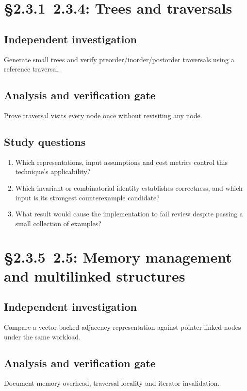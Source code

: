 \documentclass[11pt,letterpaper]{article}
\begin{document}
\section{\S 2.3.1--2.3.4: Trees and traversals}
\subsection{Independent investigation}
Generate small trees and verify preorder/inorder/postorder traversals using a reference traversal.
\subsection{Analysis and verification gate}
Prove traversal visits every node once without revisiting any node.
\subsection{Study questions}
\begin{enumerate}
\item Which representations, input assumptions and cost metrics control this technique's applicability?
\item Which invariant or combinatorial identity establishes correctness, and which input is its strongest counterexample candidate?
\item What result would cause the implementation to fail review despite passing a small collection of examples?
\end{enumerate}

\section{\S 2.3.5--2.5: Memory management and multilinked structures}
\subsection{Independent investigation}
Compare a vector-backed adjacency representation against pointer-linked nodes under the same workload.
\subsection{Analysis and verification gate}
Document memory overhead, traversal locality and iterator invalidation.
\end{document}
